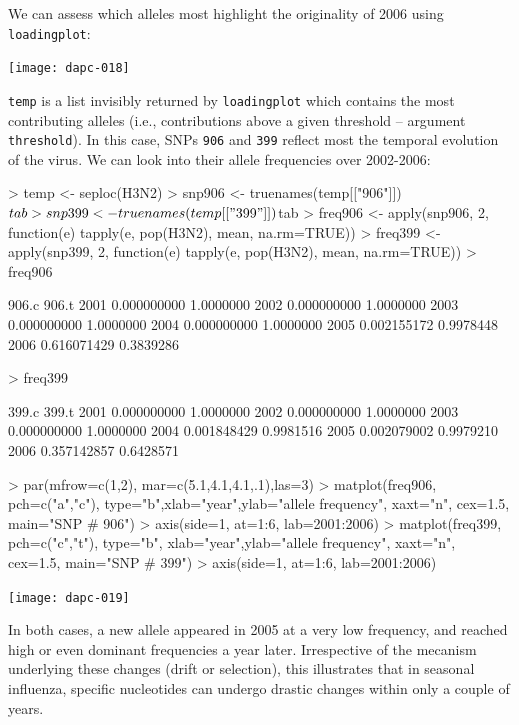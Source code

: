\documentclass{article}
\begin{document}
We can assess which alleles most highlight the originality of 2006 using \texttt{loadingplot}:
\begin{Schunk}
\end{Schunk}
\texttt{[image: dapc-018]}

\noindent \texttt{temp} is a list invisibly returned by \texttt{loadingplot} which contains the most
contributing alleles (i.e., contributions above a given threshold -- argument \texttt{threshold}).
In this case, SNPs \texttt{906} and \texttt{399} reflect most the temporal evolution of the virus.
We can look into their allele frequencies over 2002-2006:
\begin{Schunk}
\begin{Sinput}
> temp <- seploc(H3N2)
> snp906 <- truenames(temp[["906"]])$tab
> snp399 <- truenames(temp[["399"]])$tab
> freq906 <- apply(snp906, 2, function(e) tapply(e, pop(H3N2), mean, na.rm=TRUE))
> freq399 <- apply(snp399, 2, function(e) tapply(e, pop(H3N2), mean, na.rm=TRUE))
> freq906
\end{Sinput}
\begin{Soutput}
           906.c     906.t
2001 0.000000000 1.0000000
2002 0.000000000 1.0000000
2003 0.000000000 1.0000000
2004 0.000000000 1.0000000
2005 0.002155172 0.9978448
2006 0.616071429 0.3839286
\end{Soutput}
\begin{Sinput}
> freq399
\end{Sinput}
\begin{Soutput}
           399.c     399.t
2001 0.000000000 1.0000000
2002 0.000000000 1.0000000
2003 0.000000000 1.0000000
2004 0.001848429 0.9981516
2005 0.002079002 0.9979210
2006 0.357142857 0.6428571
\end{Soutput}
\begin{Sinput}
> par(mfrow=c(1,2), mar=c(5.1,4.1,4.1,.1),las=3)
> matplot(freq906, pch=c("a","c"), type="b",xlab="year",ylab="allele frequency", xaxt="n", cex=1.5, main="SNP # 906")
> axis(side=1, at=1:6, lab=2001:2006)
> matplot(freq399, pch=c("c","t"), type="b", xlab="year",ylab="allele frequency", xaxt="n", cex=1.5, main="SNP # 399")
> axis(side=1, at=1:6, lab=2001:2006)
\end{Sinput}
\end{Schunk}
\texttt{[image: dapc-019]}

In both cases, a new allele appeared in 2005 at a very low frequency, and reached high or even dominant frequencies a
year later.
Irrespective of the mecanism underlying these changes (drift or selection), this illustrates that in
seasonal influenza, specific nucleotides can undergo drastic changes within only a couple of years.
\end{document}
